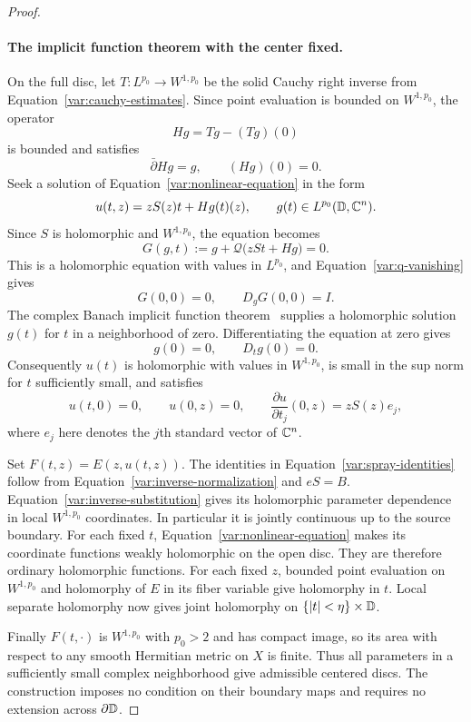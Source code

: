 \begin{proof}
\paragraph{The implicit function theorem with the center fixed.}
On the full disc, let $T\colon L^{p_0}\to W^{1,p_0}$ be the solid Cauchy
right inverse from Equation~\eqref{var:cauchy-estimates}.  Since
point evaluation is bounded on $W^{1,p_0}$, the operator
\[
 Hg=Tg-(Tg)(0)
\]
is bounded and satisfies
\begin{equation}\label{var:centered-inverse}
 \bar\partial Hg=g,\qquad (Hg)(0)=0.
\end{equation}
Seek a solution of Equation~\eqref{var:nonlinear-equation} in the
form
\begin{equation}\label{var:u-ansatz}
 u(t,z)=zS(z)t+Hg(t)(z),\qquad g(t)\in L^{p_0}(\mathbb D,\mathbb C^n).
\end{equation}
Since $S$ is holomorphic and $W^{1,p_0}$, the equation becomes
\[
 G(g,t):=g+\mathcal Q\bigl(zSt+Hg\bigr)=0.
\]
This is a holomorphic equation with values in $L^{p_0}$, and
Equation~\eqref{var:q-vanishing} gives
\[
 G(0,0)=0,\qquad D_gG(0,0)=I.
\]
The complex Banach implicit function
theorem~\cite[Theorem~2.3(ii), (d) of the author's preprint]{Glockner2006}
supplies a holomorphic
solution $g(t)$ for $t$ in a neighborhood of zero.  Differentiating
the equation at zero gives
\[
 g(0)=0,\qquad D_tg(0)=0.
\]
Consequently $u(t)$ is holomorphic with values in $W^{1,p_0}$, is small
in the sup norm for $t$ sufficiently small, and satisfies
\[
 u(t,0)=0,\qquad u(0,z)=0,\qquad
 \frac{\partial u}{\partial t_j}(0,z)=zS(z)e_j,
\]
where $e_j$ here denotes the $j$th standard vector of $\mathbb C^n$.

Set $F(t,z)=E(z,u(t,z))$.  The identities in
Equation~\eqref{var:spray-identities} follow from
Equation~\eqref{var:inverse-normalization} and $eS=B$.
Equation~\eqref{var:inverse-substitution} gives its holomorphic
parameter dependence in local $W^{1,p_0}$ coordinates.  In particular
it is jointly continuous up to the source boundary.  For each fixed
$t$, Equation~\eqref{var:nonlinear-equation} makes its coordinate
functions weakly holomorphic on the open disc.  They are therefore
ordinary holomorphic functions.  For each fixed $z$, bounded point
evaluation on $W^{1,p_0}$ and holomorphy of $E$ in its fiber variable
give holomorphy in $t$.  Local separate holomorphy now gives joint
holomorphy on $\{|t|<\eta\}\times\mathbb D$.

Finally $F(t,\cdot)$ is $W^{1,p_0}$ with $p_0>2$ and has compact image,
so its area with respect to any smooth Hermitian metric on $X$ is
finite.  Thus all parameters in a sufficiently small complex
neighborhood give admissible centered discs.  The construction imposes
no condition on their boundary maps and requires no extension across
$\partial\mathbb D$.
\end{proof}

